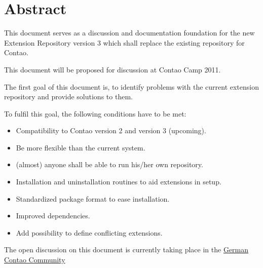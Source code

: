 \chapter{Abstract}

This document serves as a discussion and documentation foundation for the new Extension Repository version 3 which shall replace the existing repository for Contao.

This document will be proposed for discussion at Contao Camp 2011.

The first goal of this document is, to identify problems with the current extension repository and provide solutions to them.

To fulfil this goal, the following conditions have to be met:
\begin{itemize}
\item Compatibility to Contao version 2 and version 3 (upcoming).
\item Be more flexible than the current system.
\item (almost) anyone shall be able to run his/her own repository.
\item Installation and uninstallation routines to aid extensions in setup.
\item Standardized package format to ease installation.
\item Improved dependencies.
\item Add possibility to define conflicting extensions.
\end{itemize}

The open discussion on this document is currently taking place in the 
\hyperlink{http://www.contao-community.de/showthread.php?22031-Gruppe-neuer-ER-Client-und-ER3}{German Contao Community}


